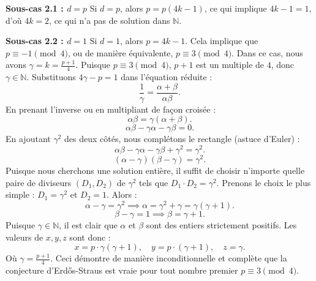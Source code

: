 \documentclass[12pt, a4paper]{article}
\begin{document}
\textbf{Sous-cas 2.1 : $d = p$}
Si $d = p$, alors $p = p(4k - 1)$, ce qui implique $4k - 1 = 1$, d'où $4k = 2$, ce qui n'a pas de solution dans $\mathbb{N}$.

\textbf{Sous-cas 2.2 : $d = 1$}
Si $d = 1$, alors $p = 4k - 1$.
Cela implique que $p \equiv -1 \pmod 4$, ou de manière équivalente, $p \equiv 3 \pmod 4$.
Dans ce cas, nous avons $\gamma = k = \frac{p+1}{4}$.
Puisque $p \equiv 3 \pmod 4$, $p+1$ est un multiple de $4$, donc $\gamma \in \mathbb{N}$.
Substituons $4\gamma - p = 1$ dans l'équation réduite :
\begin{equation}
\frac{1}{\gamma} = \frac{\alpha + \beta}{\alpha\beta}.
\end{equation}
En prenant l'inverse ou en multipliant de façon croisée :
\begin{equation}
\alpha\beta = \gamma(\alpha + \beta).
\end{equation}
\begin{equation}
\alpha\beta - \gamma\alpha - \gamma\beta = 0.
\end{equation}
En ajoutant $\gamma^2$ des deux côtés, nous complétons le rectangle (astuce d'Euler) :
\begin{equation}
\alpha\beta - \gamma\alpha - \gamma\beta + \gamma^2 = \gamma^2.
\end{equation}
\begin{equation}
(\alpha - \gamma)(\beta - \gamma) = \gamma^2.
\end{equation}
Puisque nous cherchons une solution entière, il suffit de choisir n'importe quelle paire de diviseurs $(D_1, D_2)$ de $\gamma^2$ tels que $D_1 \cdot D_2 = \gamma^2$.
Prenons le choix le plus simple : $D_1 = \gamma^2$ et $D_2 = 1$.
Alors :
\begin{equation}
\alpha - \gamma = \gamma^2 \implies \alpha = \gamma^2 + \gamma = \gamma(\gamma + 1).
\end{equation}
\begin{equation}
\beta - \gamma = 1 \implies \beta = \gamma + 1.
\end{equation}
Puisque $\gamma \in \mathbb{N}$, il est clair que $\alpha$ et $\beta$ sont des entiers strictement positifs.
Les valeurs de $x, y, z$ sont donc :
\begin{equation}
x = p \cdot \gamma(\gamma + 1), \quad y = p \cdot (\gamma + 1), \quad z = \gamma.
\end{equation}
Où $\gamma = \frac{p+1}{4}$.
Ceci démontre de manière inconditionnelle et complète que la conjecture d'Erd\H{o}s-Straus est vraie pour tout nombre premier $p \equiv 3 \pmod 4$.
\end{document}
